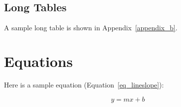\subsection{Long Tables}
A sample long table is shown in Appendix~\ref{appendix_b}.

\section{Equations}

Here is a sample equation (Equation~\ref{eq_lineslope}):

\begin{equation} \label{eq_lineslope}
	y = mx + b
\end{equation}